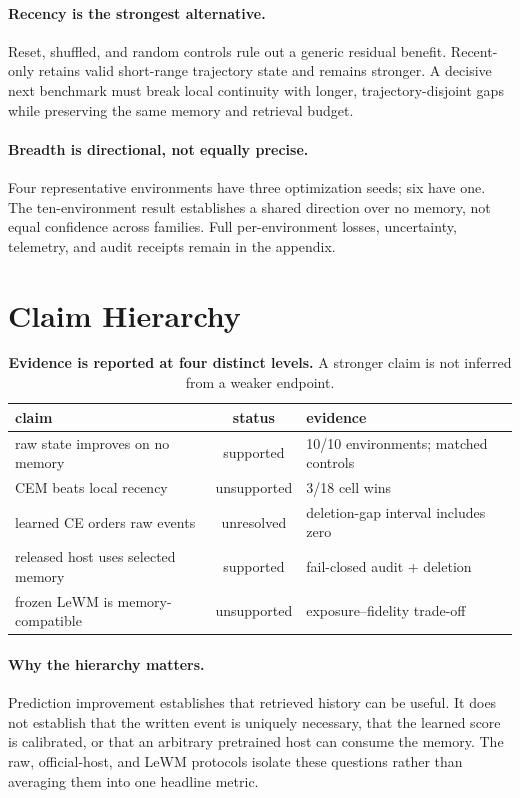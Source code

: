 \paragraph{Recency is the strongest alternative.}
Reset, shuffled, and random controls rule out a generic residual benefit.
Recent-only retains valid short-range trajectory state and remains stronger.
A decisive next benchmark must break local continuity with longer,
trajectory-disjoint gaps while preserving the same memory and retrieval
budget.

\paragraph{Breadth is directional, not equally precise.}
Four representative environments have three optimization seeds; six have one.
The ten-environment result establishes a shared direction over no memory, not
equal confidence across families. Full per-environment losses, uncertainty,
telemetry, and audit receipts remain in the appendix.

\section{Claim Hierarchy}

\begin{table}[t]
\centering\footnotesize
\caption{\textbf{Evidence is reported at four distinct levels.} A stronger
claim is not inferred from a weaker endpoint.}
\label{tab:claim-hierarchy}
\begin{tabularx}{\linewidth}{YcY}
\toprule
claim & status & evidence\\
\midrule
raw state improves on no memory & supported & 10/10 environments; matched controls\\
CEM beats local recency & unsupported & 3/18 cell wins\\
learned CE orders raw events & unresolved & deletion-gap interval includes zero\\
released host uses selected memory & supported & fail-closed audit + deletion\\
frozen LeWM is memory-compatible & unsupported & exposure--fidelity trade-off\\
\bottomrule
\end{tabularx}
\end{table}

\paragraph{Why the hierarchy matters.}
Prediction improvement establishes that retrieved history can be useful. It
does not establish that the written event is uniquely necessary, that the
learned score is calibrated, or that an arbitrary pretrained host can consume
the memory. The raw, official-host, and LeWM protocols isolate these questions
rather than averaging them into one headline metric.

